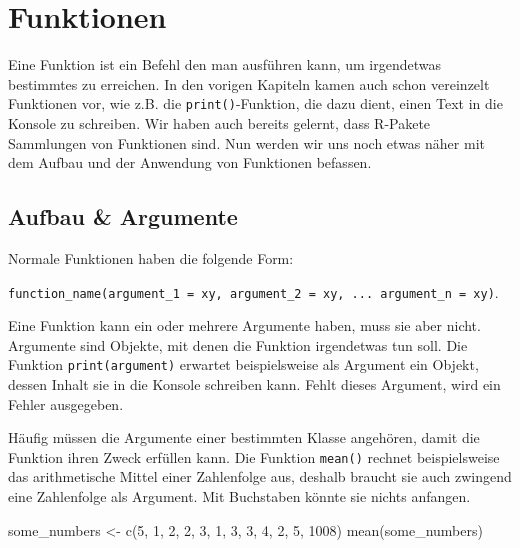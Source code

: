\documentclass[
]{book}
\newenvironment{Shaded}{\begin{snugshade}}{\end{snugshade}}
\newcommand{\DecValTok}[1]{\textcolor[rgb]{0.00,0.00,0.81}{#1}}
\newcommand{\FunctionTok}[1]{\textcolor[rgb]{0.00,0.00,0.00}{#1}}
\newcommand{\NormalTok}[1]{#1}
\newcommand{\OtherTok}[1]{\textcolor[rgb]{0.56,0.35,0.01}{#1}}
\begin{document}
\hypertarget{funktionen}{%
\section{Funktionen}\label{funktionen}}

Eine Funktion ist ein Befehl den man ausführen kann, um irgendetwas bestimmtes zu erreichen. In den vorigen Kapiteln kamen auch schon vereinzelt Funktionen vor, wie z.B. die \texttt{print()}-Funktion, die dazu dient, einen Text in die Konsole zu schreiben. Wir haben auch bereits gelernt, dass R-Pakete Sammlungen von Funktionen sind. Nun werden wir uns noch etwas näher mit dem Aufbau und der Anwendung von Funktionen befassen.

\hypertarget{aufbau-argumente}{%
\subsection{Aufbau \& Argumente}\label{aufbau-argumente}}

Normale Funktionen haben die folgende Form:

\texttt{function\_name(argument\_1\ =\ xy,\ argument\_2\ =\ xy,\ ...\ argument\_n\ =\ xy)}.

Eine Funktion kann ein oder mehrere Argumente haben, muss sie aber nicht. Argumente sind Objekte, mit denen die Funktion irgendetwas tun soll. Die Funktion \texttt{print(argument)} erwartet beispielsweise als Argument ein Objekt, dessen Inhalt sie in die Konsole schreiben kann. Fehlt dieses Argument, wird ein Fehler ausgegeben.

Häufig müssen die Argumente einer bestimmten Klasse angehören, damit die Funktion ihren Zweck erfüllen kann. Die Funktion \texttt{mean()} rechnet beispielsweise das arithmetische Mittel einer Zahlenfolge aus, deshalb braucht sie auch zwingend eine Zahlenfolge als Argument. Mit Buchstaben könnte sie nichts anfangen.

\begin{Shaded}
\begin{Highlighting}[]
\NormalTok{some\_numbers }\OtherTok{\textless{}{-}} \FunctionTok{c}\NormalTok{(}\DecValTok{5}\NormalTok{, }\DecValTok{1}\NormalTok{, }\DecValTok{2}\NormalTok{, }\DecValTok{2}\NormalTok{, }\DecValTok{3}\NormalTok{, }\DecValTok{1}\NormalTok{, }\DecValTok{3}\NormalTok{, }\DecValTok{3}\NormalTok{, }\DecValTok{4}\NormalTok{, }\DecValTok{2}\NormalTok{, }\DecValTok{5}\NormalTok{, }\DecValTok{1008}\NormalTok{)}
\FunctionTok{mean}\NormalTok{(some\_numbers)}
\end{Highlighting}
\end{Shaded}
\end{document}

